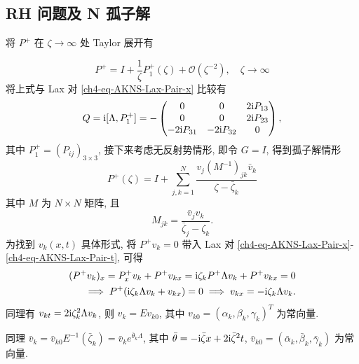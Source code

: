     \subsection{RH 问题及 N 孤子解}
    将 $P^{+}$ 在 $\zeta \to \infty$ 处 Taylor 展开有

    \begin{equation}
        P^{+} = I + \frac{1}{\zeta} P_{1}^{+}(\zeta) + \mathcal{O}(\zeta^{-2}), \quad \zeta \to \infty
    \end{equation}
    将上式与 Lax 对 \eqref{ch4-eq-AKNS-Lax-Pair-x} 比较有
    \begin{equation}
        Q = \mathrm{i} [\Lambda, P_{1}^{+}] = - \begin{pmatrix}
            0 & 0 & 2 \mathrm{i} P_{13} \\ 0 & 0 & 2 \mathrm{i} P_{23} \\ -2 \mathrm{i} P_{31} & -2 \mathrm{i} P_{32} & 0
        \end{pmatrix},
    \end{equation}
    其中 $P_{1}^{+} = (P_{ij})_{3 \times 3}$, 接下来考虑无反射势情形, 即令 $G = I$, 得到孤子解情形
    \begin{equation}
        P^{+}(\zeta) = I + \sum_{j,k = 1}^{N} \frac{v_{j} (M^{-1})_{jk} \bar{v}_{k}}{\zeta - \bar{\zeta}_{k}}
        \label{ch4-corrected-eq-reflectionless-P-plus}
    \end{equation}
    其中 $M$ 为 $N \times N$ 矩阵, 且
    \begin{equation}
        M_{jk} = \frac{\bar{v}_{j} v_{k}}{\bar{\zeta}_{j} - \zeta_{k}}.
    \end{equation}
    为找到 $v_{k}(x,t)$ 具体形式, 将 $P^{+} v_{k} = 0$ 带入 Lax 对 \eqref{ch4-eq-AKNS-Lax-Pair-x}-\eqref{ch4-eq-AKNS-Lax-Pair-t}, 可得
    \begin{equation}
        \begin{aligned}
            (P^{+}v_{k})_{x} = P_{x}^{+} v_{k} + P^{+} v_{kx} = \mathrm{i} \zeta_{k} P^{+} \Lambda v_{k} + P^{+} v_{kx} = 0  \\
            \implies P^{+}(\mathrm{i} \zeta_{k} \Lambda v_{k} + v_{kx}) = 0 \implies v_{kx} = -\mathrm{i} \zeta_{k} \Lambda v_{k}. \\
        \end{aligned}
    \end{equation}
    同理有 $v_{kt} = 2 \mathrm{i} \zeta_{k}^{2} \Lambda v_{k}$, 则 $v_{k} = E v_{k0}$, 其中 $v_{k0} = (\alpha_{k}, \beta_{k}, \gamma_{k})^{T}$ 为常向量.

    同理 $\bar{v}_{k} = \bar{v}_{k0} E^{-1}(\bar{\zeta}_{k}) = \bar{v}_{k} e^{\bar{\theta}_{k}\Lambda}$, 其中 $\bar{\theta} = -\mathrm{i} \bar{\zeta} x + 2\mathrm{i} \bar{\zeta}^{2} t$, $\bar{v}_{k0} = (\bar{\alpha}_{k}, \bar{\beta}_{k}, \bar{\gamma}_{k})$ 为常向量.
\fi

